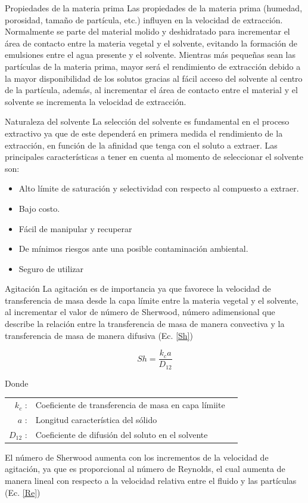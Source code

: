 \documentclass[11pt,a4paper]{article}
\begin{document}
\begin{descriptionB}

	\item[Propiedades de la materia prima] Las propiedades de la materia prima (humedad, porosidad, tamaño de partícula, etc.) influyen en la velocidad de extracción.
		Normalmente se parte del material molido y deshidratado para incrementar el área de contacto entre la materia vegetal y el solvente, evitando la formación de emulsiones entre el agua presente y el solvente.
		Mientras más pequeñas sean las partículas de la materia prima, mayor será el rendimiento de extracción debido a la mayor disponibilidad de los solutos gracias al fácil acceso del solvente al centro de la partícula, además, al incrementar el área de contacto entre el material y el solvente se incrementa la velocidad de extracción.

	\item[Naturaleza del solvente] La selección del solvente es fundamental en el proceso extractivo ya que de este dependerá en primera medida el rendimiento de la extracción, en función de la afinidad que tenga con el soluto a extraer.
		Las principales características a tener en cuenta al momento de seleccionar el solvente son:
		\begin{itemize}
			\item Alto límite de saturación y selectividad con respecto al compuesto a extraer.
			\item Bajo costo.
			\item Fácil de manipular y recuperar
			\item De mínimos riesgos ante una posible contaminación ambiental.
			\item Seguro de utilizar
		\end{itemize}
	\item[Agitación] La agitación es de importancia ya que favorece la velocidad de transferencia de masa desde la capa límite entre la materia vegetal y el solvente, al incrementar el valor de número de Sherwood, número adimensional que describe la relación entre la transferencia de masa de manera convectiva y la transferencia de masa de manera difusiva (Ec. \ref{Sh})
	
		\begin{equation}
			Sh = \frac{k_{c}a}{D_{12}}\label{Sh}
		\end{equation}

		Donde
		\begin{center}		

		\begin{tabular}{rlr}
			$k_{c}$ :& Coeficiente de transferencia de masa en capa límiite\\
			$a$ :& Longitud característica del sólido \\
			$D_{12}$ :& Coeficiente de difusión del soluto en el solvente \\
		\end{tabular}
		\end{center}
		El número de Sherwood aumenta con los incrementos de la velocidad de agitación, ya que es proporcional al número de Reynolds, el cual aumenta de manera lineal con respecto a la velocidad relativa entre el fluido y las partículas (Ec. \ref{Re})


\end{descriptionB}
\end{document}
